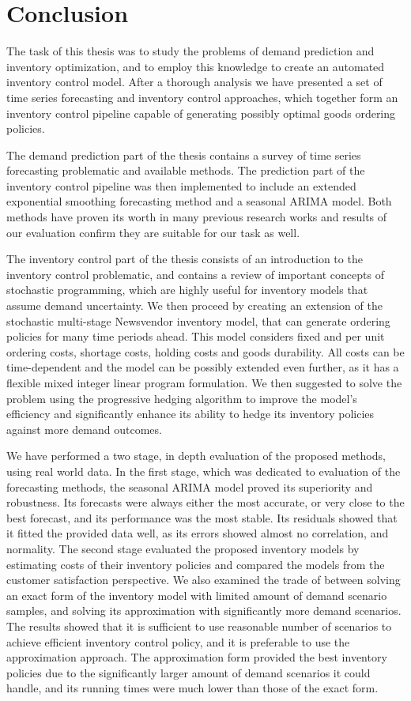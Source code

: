 \documentclass[11pt,a4paper]{article}
\begin{document}
\newpage
\section{Conclusion}
The task of this thesis was to study the problems of demand prediction and inventory optimization, and to employ this knowledge to create an automated inventory control model. After a thorough analysis we have presented a set of time series forecasting and inventory control approaches, which together form an inventory control pipeline capable of generating possibly optimal goods ordering policies.

The demand prediction part of the thesis contains a survey of time series forecasting problematic and available methods. The prediction part of the inventory control pipeline was then implemented to include an extended exponential smoothing forecasting method and a seasonal ARIMA model. Both methods have proven its worth in many previous research works and results of our evaluation confirm they are suitable for our task as well.


The inventory control part of the thesis consists of an introduction to the inventory control problematic, and contains a review of important concepts of stochastic programming, which are highly useful for inventory models that assume demand uncertainty. We then proceed by creating an extension of the stochastic multi-stage Newsvendor inventory model, that can generate ordering policies for many time periods ahead. This model considers fixed and per unit ordering costs, shortage costs, holding costs and goods durability. All costs can be time-dependent and the model can be possibly extended even further, as it has a flexible mixed integer linear program formulation. We then suggested to solve the problem using the progressive hedging algorithm to improve the model's efficiency and significantly enhance its ability to hedge its inventory policies against more demand outcomes.


We have performed a two stage, in depth evaluation of the proposed methods, using real world data.
In the first stage, which was dedicated to evaluation of the forecasting methods, the seasonal ARIMA model proved its superiority and robustness. Its forecasts were always either the most accurate, or very close to the best forecast, and its performance was the most stable. Its residuals showed that it fitted the provided data well, as its errors showed almost no correlation, and normality. The second stage evaluated the proposed inventory models by estimating costs of their inventory policies and compared the models from the customer satisfaction perspective. We also examined the trade of between solving an exact form of the inventory model with limited amount of demand scenario samples, and solving its approximation with significantly more demand scenarios. The results showed that it is sufficient to use reasonable number of scenarios to achieve efficient inventory control policy, and it is preferable to use the approximation approach. The approximation form provided the best inventory policies due to the significantly larger amount of demand scenarios it could handle, and its running times were much lower than those of the exact form.
\end{document}
